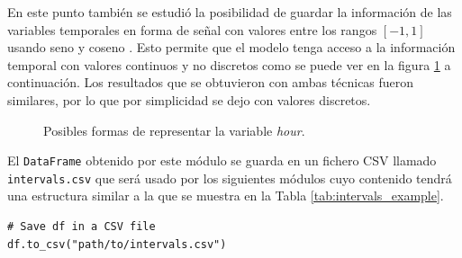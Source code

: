 \begin{enumerate}
    
    En este punto también se estudió la posibilidad de guardar la información de las variables temporales en forma de señal con valores entre los rangos $[-1, 1]$ usando seno y coseno \cite{reddit_time}. Esto permite que el modelo tenga acceso a la información temporal con valores continuos y no discretos como se puede ver en la figura \ref{fig:hour-stepvssignal} a continuación. Los resultados que se obtuvieron con ambas técnicas fueron similares, por lo que por simplicidad se dejo con valores discretos.
    
   \begin{figure}[H]
  \centering
  \hfill
  \caption{Posibles formas de representar la variable \textit{hour}.}
  \label{fig:hour-stepvssignal}
\end{figure}
    
\end{enumerate}


El \small{\verb|DataFrame|} obtenido por este módulo se guarda en un fichero CSV llamado \small{\verb|intervals.csv|} que será usado por los siguientes módulos cuyo contenido tendrá una estructura similar a la que se muestra en la Tabla \ref{tab:intervals_example}.

\begin{verbatim}
# Save df in a CSV file
df.to_csv("path/to/intervals.csv")
\end{verbatim}